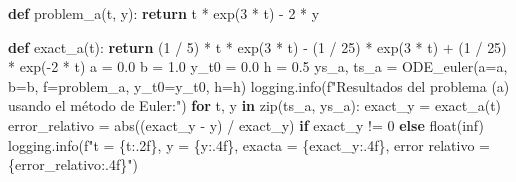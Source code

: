 \documentclass[
  letterpaper,
  DIV=11,
  numbers=noendperiod]{scrartcl}
\newenvironment{Shaded}{\begin{snugshade}}{\end{snugshade}}
\newcommand{\BuiltInTok}[1]{\textcolor[rgb]{0.00,0.23,0.31}{#1}}
\newcommand{\ControlFlowTok}[1]{\textcolor[rgb]{0.00,0.23,0.31}{\textbf{#1}}}
\newcommand{\DecValTok}[1]{\textcolor[rgb]{0.68,0.00,0.00}{#1}}
\newcommand{\FloatTok}[1]{\textcolor[rgb]{0.68,0.00,0.00}{#1}}
\newcommand{\KeywordTok}[1]{\textcolor[rgb]{0.00,0.23,0.31}{\textbf{#1}}}
\newcommand{\NormalTok}[1]{\textcolor[rgb]{0.00,0.23,0.31}{#1}}
\newcommand{\OperatorTok}[1]{\textcolor[rgb]{0.37,0.37,0.37}{#1}}
\newcommand{\SpecialCharTok}[1]{\textcolor[rgb]{0.37,0.37,0.37}{#1}}
\newcommand{\SpecialStringTok}[1]{\textcolor[rgb]{0.13,0.47,0.30}{#1}}
\newcommand{\StringTok}[1]{\textcolor[rgb]{0.13,0.47,0.30}{#1}}
\begin{document}
\begin{Shaded}
\begin{Highlighting}[]
\KeywordTok{def}\NormalTok{ problem\_a(t, y):}
    \ControlFlowTok{return}\NormalTok{ t }\OperatorTok{*}\NormalTok{ exp(}\DecValTok{3} \OperatorTok{*}\NormalTok{ t) }\OperatorTok{{-}} \DecValTok{2} \OperatorTok{*}\NormalTok{ y}

\KeywordTok{def}\NormalTok{ exact\_a(t):}
    \ControlFlowTok{return}\NormalTok{ (}\DecValTok{1} \OperatorTok{/} \DecValTok{5}\NormalTok{) }\OperatorTok{*}\NormalTok{ t }\OperatorTok{*}\NormalTok{ exp(}\DecValTok{3} \OperatorTok{*}\NormalTok{ t) }\OperatorTok{{-}}\NormalTok{ (}\DecValTok{1} \OperatorTok{/} \DecValTok{25}\NormalTok{) }\OperatorTok{*}\NormalTok{ exp(}\DecValTok{3} \OperatorTok{*}\NormalTok{ t) }\OperatorTok{+}\NormalTok{ (}\DecValTok{1} \OperatorTok{/} \DecValTok{25}\NormalTok{) }\OperatorTok{*}\NormalTok{ exp(}\OperatorTok{{-}}\DecValTok{2} \OperatorTok{*}\NormalTok{ t)}
\NormalTok{a }\OperatorTok{=} \FloatTok{0.0}
\NormalTok{b }\OperatorTok{=} \FloatTok{1.0}
\NormalTok{y\_t0 }\OperatorTok{=} \FloatTok{0.0}
\NormalTok{h }\OperatorTok{=} \FloatTok{0.5}
\NormalTok{ys\_a, ts\_a }\OperatorTok{=}\NormalTok{ ODE\_euler(a}\OperatorTok{=}\NormalTok{a, b}\OperatorTok{=}\NormalTok{b, f}\OperatorTok{=}\NormalTok{problem\_a, y\_t0}\OperatorTok{=}\NormalTok{y\_t0, h}\OperatorTok{=}\NormalTok{h)}
\NormalTok{logging.info(}\SpecialStringTok{f"Resultados del problema (a) usando el método de Euler:"}\NormalTok{)}
\ControlFlowTok{for}\NormalTok{ t, y }\KeywordTok{in} \BuiltInTok{zip}\NormalTok{(ts\_a, ys\_a):}
\NormalTok{    exact\_y }\OperatorTok{=}\NormalTok{ exact\_a(t)}
\NormalTok{    error\_relativo }\OperatorTok{=} \BuiltInTok{abs}\NormalTok{((exact\_y }\OperatorTok{{-}}\NormalTok{ y) }\OperatorTok{/}\NormalTok{ exact\_y) }\ControlFlowTok{if}\NormalTok{ exact\_y }\OperatorTok{!=} \DecValTok{0} \ControlFlowTok{else} \BuiltInTok{float}\NormalTok{(}\StringTok{\textquotesingle{}inf\textquotesingle{}}\NormalTok{)}
\NormalTok{    logging.info(}\SpecialStringTok{f"t = }\SpecialCharTok{\{}\NormalTok{t}\SpecialCharTok{:.2f\}}\SpecialStringTok{, y = }\SpecialCharTok{\{}\NormalTok{y}\SpecialCharTok{:.4f\}}\SpecialStringTok{, exacta = }\SpecialCharTok{\{}\NormalTok{exact\_y}\SpecialCharTok{:.4f\}}\SpecialStringTok{, error relativo = }\SpecialCharTok{\{}\NormalTok{error\_relativo}\SpecialCharTok{:.4f\}}\SpecialStringTok{"}\NormalTok{)}
\end{Highlighting}
\end{Shaded}
\end{document}

